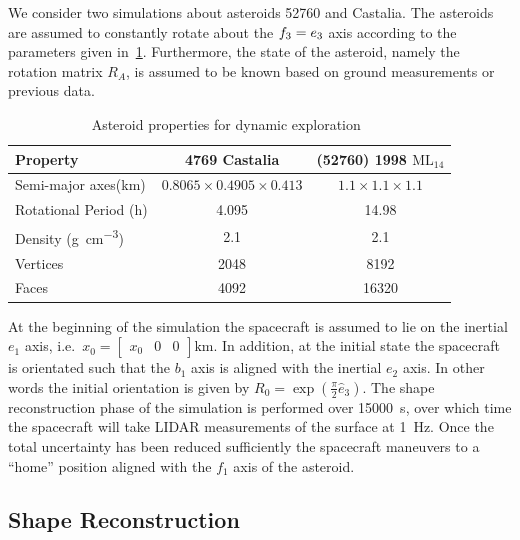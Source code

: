 \documentclass[journal]{new-aiaa}
\begin{document}
We consider two simulations about asteroids \num{52760} and Castalia.
The asteroids are assumed to constantly rotate about the \( f_3 = e_3\) axis according to the parameters given in~\cref{tab:dynamic_asteroids}.
Furthermore, the state of the asteroid, namely the rotation matrix \( R_A \), is assumed to be known based on ground measurements or previous data.
\begin{table}[htbp]
    \centering
    \begin{tabular}{lcc}
        \toprule
        Property & \num{4769} Castalia & (\num{52760}) \num{1998} \(\text{ML}_{14}\) \\
        \midrule
        Semi-major axes(\si{\kilo\meter}) & \( 0.8065 \times 0.4905 \times 0.413 \) & \( 1.1 \times 1.1 \times 1.1 \) \\
        Rotational Period (\si{\hour}) & \num{4.095} & \num{14.98} \\
        Density (\si{\gram\per\centi\meter^3}) & \num{2.1} & \num{2.1} \\
        Vertices & \num{2048}  & \num{8192} \\
        Faces & \num{4092} & \num{16320} \\
        \bottomrule
    \end{tabular}
    \caption{Asteroid properties for dynamic exploration~\label{tab:dynamic_asteroids}}
\end{table}
At the beginning of the simulation the spacecraft is assumed to lie on the inertial \( e_1 \) axis, i.e.\ \( x_0 = \begin{bmatrix} x_0 & 0 & 0 \end{bmatrix} \si{\kilo\meter} \).
In addition, at the initial state the spacecraft is orientated such that the \( b_1 \) axis is aligned with the inertial \( e_2 \) axis.
In other words the initial orientation is given by \( R_0 = \exp(\frac{\pi}{2} \hat{e}_3)\).
The shape reconstruction phase of the simulation is performed over \SI{15000}{\second}, over which time the spacecraft will take LIDAR measurements of the surface at \SI{1}{\hertz}.
Once the total uncertainty has been reduced sufficiently the spacecraft maneuvers to a ``home'' position aligned with the \( f_1 \) axis of the asteroid.

\subsection{Shape Reconstruction}\label{sec:kinematic_exploration}
\end{document}
